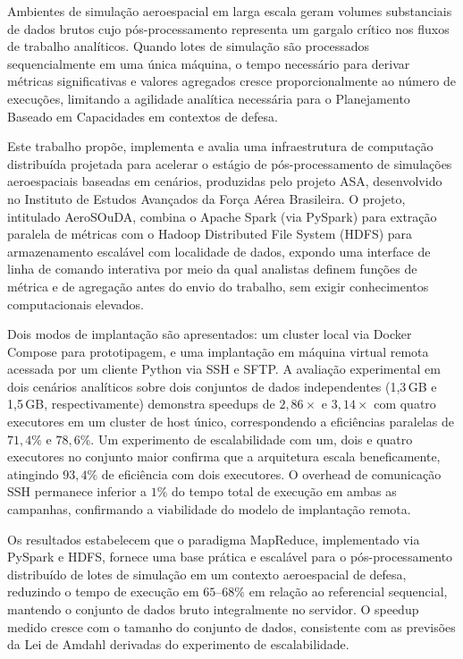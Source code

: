 Ambientes de simulação aeroespacial em larga escala geram volumes substanciais de dados
brutos cujo pós-processamento representa um gargalo crítico nos fluxos de trabalho analíticos.
Quando lotes de simulação são processados sequencialmente em uma única máquina, o tempo necessário
para derivar métricas significativas e valores agregados cresce proporcionalmente ao número
de execuções, limitando a agilidade analítica necessária para o Planejamento Baseado em
Capacidades em contextos de defesa.

Este trabalho propõe, implementa e avalia uma infraestrutura de computação distribuída projetada
para acelerar o estágio de pós-processamento de simulações aeroespaciais baseadas em cenários,
produzidas pelo projeto ASA, desenvolvido no Instituto de Estudos Avançados da Força Aérea
Brasileira. O projeto, intitulado AeroSOuDA, combina o Apache Spark (via PySpark) para extração
paralela de métricas com o Hadoop Distributed File System (HDFS) para armazenamento escalável
com localidade de dados, expondo uma interface de linha de comando interativa por meio da qual
analistas definem funções de métrica e de agregação antes do envio do trabalho, sem exigir
conhecimentos computacionais elevados.

Dois modos de implantação são apresentados: um cluster local via Docker Compose para
prototipagem, e uma implantação em máquina virtual remota acessada por um cliente
Python via SSH e SFTP. A avaliação experimental em dois cenários analíticos sobre dois
conjuntos de dados independentes (1,3\,GB e 1,5\,GB, respectivamente) demonstra speedups de
$2{,}86\times$ e $3{,}14\times$ com quatro executores em um cluster de host único,
correspondendo a eficiências paralelas de $71{,}4\%$ e $78{,}6\%$. Um experimento de
escalabilidade com um, dois e quatro executores no conjunto maior confirma que a arquitetura
escala beneficamente, atingindo $93{,}4\%$ de eficiência com dois executores. O overhead de
comunicação SSH permanece inferior a $1\%$ do tempo total de execução em ambas as campanhas,
confirmando a viabilidade do modelo de implantação remota.

Os resultados estabelecem que o paradigma MapReduce, implementado via PySpark e HDFS,
fornece uma base prática e escalável para o pós-processamento distribuído de lotes de
simulação em um contexto aeroespacial de defesa, reduzindo o tempo de execução em
$65$--$68\%$ em relação ao referencial sequencial, mantendo o conjunto de dados bruto
integralmente no servidor. O speedup medido cresce com o tamanho do conjunto de dados,
consistente com as previsões da Lei de Amdahl derivadas do experimento de escalabilidade.